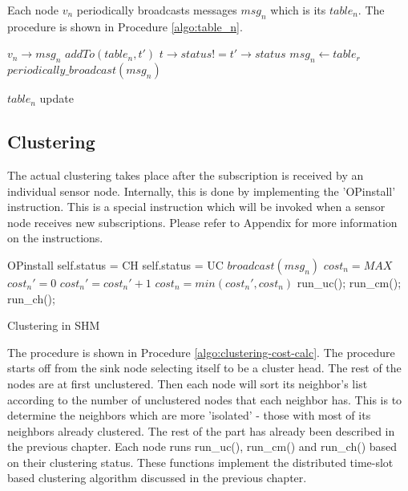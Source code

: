 Each node \(v_n\) periodically broadcasts messages \(msg_n\) which is its \(table_n\). The procedure is shown in Procedure \ref{algo:table_n}.

\begin{algorithm}
\begin{algorithmic}[1]
\REQUIRE \(v_n\rightarrow msg_n\)
			\STATE \(addTo(table_n, t')\)
		\ENDIF
				\STATE \(t\rightarrow status != t'\rightarrow status\)
			\ENDIF
		\ENDFOR
	\ENDFOR
	\STATE \(msg_n \gets table_r\)
	\STATE \(periodically\_broadcast(msg_n)\)
\end{algorithmic}
\caption{\(table_n\) update}
\label{algo:table_n}
\end{algorithm}

\subsection{Clustering}
The actual clustering takes place after the subscription is received by an individual sensor node. Internally, this is done by implementing the 'OPinstall' instruction. This is a special instruction which will be invoked when a sensor node receives new subscriptions. Please refer to Appendix for more information on the instructions.

\begin{algorithm}
\begin{algorithmic}[1]
\REQUIRE OPinstall
		\STATE self.status = CH
	\ELSE
		\STATE self.status = UC
	\ENDIF
		\STATE \(broadcast(msg_n)\)
		\STATE \(cost_n = MAX\)
			\STATE \(cost_n' = 0\)
					\STATE \(cost_n' = cost_n' + 1\)
				\ENDIF
			\ENDFOR
			\STATE \(cost_n = min(cost_n', cost_n)\)
		\ENDFOR
		\STATE run\_uc();
	\ENDWHILE
		\STATE run\_cm();
	\ELSE
		\STATE run\_ch();
	\ENDIF
\end{algorithmic}\caption{Clustering in SHM}
\label{algo:clustering-cost-calc}
\end{algorithm}

The procedure is shown in Procedure \ref{algo:clustering-cost-calc}. The procedure starts off from the sink node selecting itself to be a cluster head. The rest of the nodes are at first unclustered. Then each node will sort its neighbor's list according to the number of unclustered nodes that each neighbor has. This is to determine the neighbors which are more 'isolated' - those with most of its neighbors already clustered. The rest of the part has already been described in the previous chapter. Each node runs run\_uc(), run\_cm() and run\_ch() based on their clustering status. These functions implement the distributed time-slot based clustering algorithm discussed in the previous chapter.